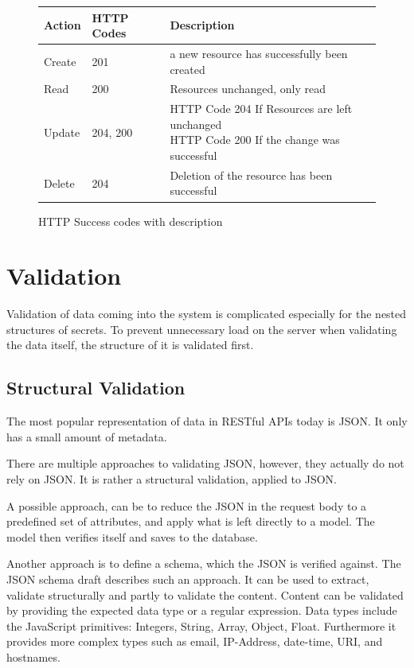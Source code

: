 \begin{figure}
  \begin{tabular}{|l|l|l|}
    \hline
    Action & HTTP Codes & Description \\ \hline
    Create & 201 & a new resource has successfully been created \\ \hline
    Read & 200 & Resources unchanged, only read \\ \hline
    Update & 204, 200 & \parbox[t]{9cm}{HTTP Code 204 If Resources are left unchanged\\ HTTP Code 200 If the change was successful} \\ \hline
    Delete & 204 & Deletion of the resource has been successful \\ \hline
  \end{tabular}
  \caption{HTTP Success codes with description}
  \centering
  \label{tab:success_codes}
\end{figure}

\section{Validation}

Validation of data coming into the system is complicated especially for the
nested structures of secrets. To prevent unnecessary load on the server when
validating the data itself, the structure of it is validated first.

\subsection{Structural Validation}

The most popular representation of data in RESTful APIs today is JSON. It only
has a small amount of metadata.

There are multiple approaches to validating JSON, however, they actually do not
rely on JSON. It is rather a structural validation, applied to JSON.

A possible approach, can be to reduce the JSON in the request body to a
predefined set of attributes, and apply what is left directly to a model. The
model then verifies itself and saves to the database.

Another approach is to define a schema, which the JSON is verified against. The
JSON schema draft describes such an approach. It can be used to extract,
validate structurally and partly to validate the content. Content can be
validated by providing the expected data type or a regular expression. Data types
include the JavaScript primitives: Integers, String, Array, Object, Float.
Furthermore it provides more complex types such as email, IP-Address,
date-time, URI, and hostnames.

